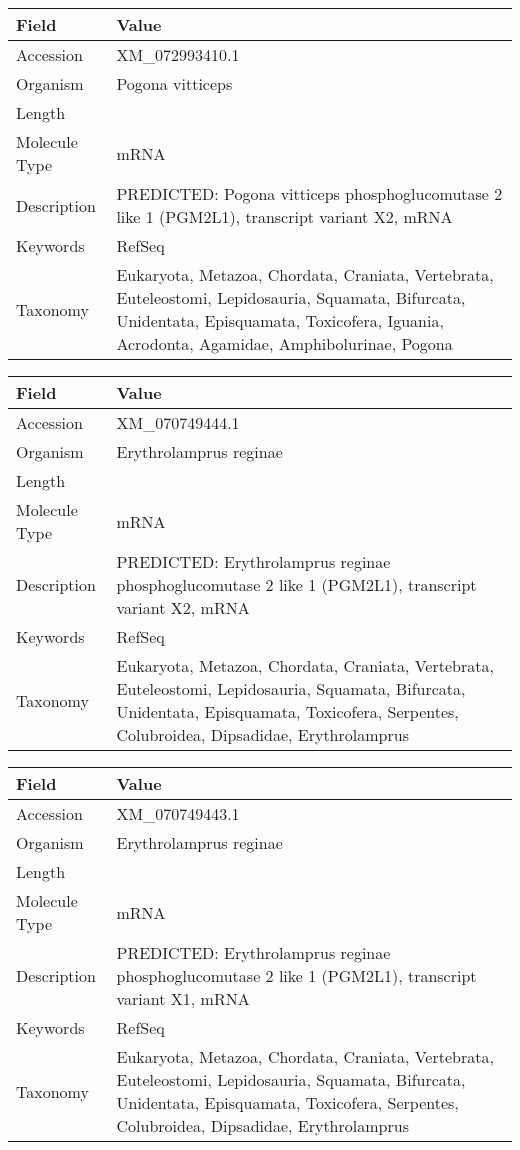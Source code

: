 \documentclass[10pt]{article}
\begin{document}
\vspace{1em}
{\footnotesize
\begin{longtable}{>{\raggedright\arraybackslash}p{4.5cm} >{\raggedright\arraybackslash}p{11.5cm}}
\textbf{Field} & \textbf{Value} \\
\hline
Accession & XM\_072993410.1 \\
Organism & Pogona vitticeps \\
Length & 3715 \\
Molecule Type & mRNA \\
Description & PREDICTED: Pogona vitticeps phosphoglucomutase 2 like 1 (PGM2L1), transcript variant X2, mRNA \\
Keywords & RefSeq \\
Taxonomy & Eukaryota, Metazoa, Chordata, Craniata, Vertebrata, Euteleostomi, Lepidosauria, Squamata, Bifurcata, Unidentata, Episquamata, Toxicofera, Iguania, Acrodonta, Agamidae, Amphibolurinae, Pogona \\
\end{longtable}
}

\vspace{1em}
{\footnotesize
\begin{longtable}{>{\raggedright\arraybackslash}p{4.5cm} >{\raggedright\arraybackslash}p{11.5cm}}
\textbf{Field} & \textbf{Value} \\
\hline
Accession & XM\_070749444.1 \\
Organism & Erythrolamprus reginae \\
Length & 2399 \\
Molecule Type & mRNA \\
Description & PREDICTED: Erythrolamprus reginae phosphoglucomutase 2 like 1 (PGM2L1), transcript variant X2, mRNA \\
Keywords & RefSeq \\
Taxonomy & Eukaryota, Metazoa, Chordata, Craniata, Vertebrata, Euteleostomi, Lepidosauria, Squamata, Bifurcata, Unidentata, Episquamata, Toxicofera, Serpentes, Colubroidea, Dipsadidae, Erythrolamprus \\
\end{longtable}
}

\vspace{1em}
{\footnotesize
\begin{longtable}{>{\raggedright\arraybackslash}p{4.5cm} >{\raggedright\arraybackslash}p{11.5cm}}
\textbf{Field} & \textbf{Value} \\
\hline
Accession & XM\_070749443.1 \\
Organism & Erythrolamprus reginae \\
Length & 2631 \\
Molecule Type & mRNA \\
Description & PREDICTED: Erythrolamprus reginae phosphoglucomutase 2 like 1 (PGM2L1), transcript variant X1, mRNA \\
Keywords & RefSeq \\
Taxonomy & Eukaryota, Metazoa, Chordata, Craniata, Vertebrata, Euteleostomi, Lepidosauria, Squamata, Bifurcata, Unidentata, Episquamata, Toxicofera, Serpentes, Colubroidea, Dipsadidae, Erythrolamprus \\
\end{longtable}
}
\end{document}
